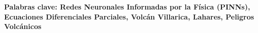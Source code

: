 \begin{abstract}

\end{abstract}

\textbf{Palabras clave: Redes Neuronales Informadas por la Física (PINNs), Ecuaciones Diferenciales Parciales, Volcán Villarica, Lahares, Peligros Volcánicos} \palabrasClave\par%
